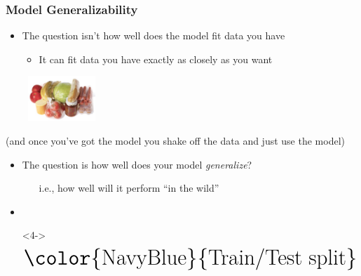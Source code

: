 \documentclass[xcolor={dvipsnames}]{beamer}
\begin{document}
\frame
{
\frametitle{Model Generalizability}

\begin{itemize}
\item The question isn't how well does the model fit data you have
\begin{itemize}
\item It can fit data you have exactly as closely as you want
\end{itemize}
\hspace{-3em}$\;$$\;$\includegraphics[width=1in]{stuff/saran.jpg}$\;$$\;$
\end{itemize}
\footnotesize
(and once you've got the model you shake off the data and just use the model) 
\begin{itemize}
\item[]
\normalsize
\item<2-> The question is how well does your model \emph{generalize}?
\begin{itemize}
\item[] i.e., how well will it perform ``in the wild''
\end{itemize}
\item<3-> 
\item[]<4->  $$\text{\Huge \color{NavyBlue}{Train/Test split}}\quad\quad$$
\end{itemize}

}
\end{document}
